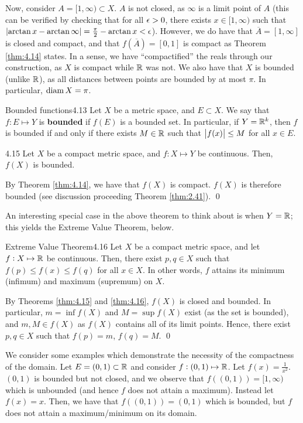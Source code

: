 Now, consider $A = [1, \infty) \subset X$. $A$ is not closed, as $\infty$ is a limit point of $A$ (this can be verified by checking that for all $\epsilon > 0$, there exists $x \in [1, \infty)$ such that $\abs{\arctan x - \arctan \infty} = \frac{\pi}{2} - \arctan x < \epsilon$). However, we do have that $\overline{A} = [1, \infty]$ is closed and compact, and that $f(\overline{A}) = [0, 1]$ is compact as Theorem \ref{thm:4.14} states. In a sense, we have ``compactified'' the reals through our construction, as $X$ is compact while $\mathbb{R}$ was not. We also have that $X$ is bounded (unlike $\mathbb{R}$), as all distances between points are bounded by at most $\pi$. In particular, $\operatorname{diam} X = \pi$. 


\setcounter{rudin}{12}
\begin{definition}{Bounded functions}{4.13}
    Let $X$ be a metric space, and $E \subset X$. We say that $f: E \mapsto Y$ is \textbf{bounded} if $f(E)$ is a bounded set. In particular, if $Y = \mathbb{R}^k$, then $f$ is bounded if and only if there exists $M \in \mathbb{R}$ such that $\abs{f(x)} \leq M$ for all $x \in E$.
\end{definition}

\setcounter{rudin}{14}
\begin{theorem}{}{4.15}
    Let $X$ be a compact metric space, and $f: X \mapsto Y$ be continuous. Then, $f(X)$ is bounded.
\end{theorem}
\begin{nproof}
    By Theorem \ref{thm:4.14}, we have that $f(X)$ is compact. $f(X)$ is therefore bounded (see discussion proceeding Theorem \ref{thm:2.41}). \qed
\end{nproof}
\noindent An interesting special case in the above theorem to think about is when $Y = \mathbb{R}$; this yields the Extreme Value Theorem, below.

\begin{theorem}{Extreme Value Theorem}{4.16}
    Let $X$ be a compact metric space, and let $f: X \mapsto \mathbb{R}$ be continuous. Then, there exist $p, q \in X$ such that $f(p) \leq f(x) \leq f(q)$ for all $x \in X$. In other words, $f$ attains its minimum (infimum) and maximum (supremum) on $X$.
\end{theorem}
\begin{nproof}
    By Theorems \ref{thm:4.15} and \ref{thm:4.16}, $f(X)$ is closed and bounded. In particular, $m = \inf f(X)$ and $M = \sup f(X)$ exist (as the set is bounded), and $m, M \in f(X)$ as $f(X)$ contains all of its limit points. Hence, there exist $p, q \in X$ such that $f(p) = m$, $f(q) = M$. \qed
\end{nproof}
\noindent We consider some examples which demonstrate the necessity of the compactness of the domain. Let $E = (0, 1) \subset \mathbb{R}$ and consider $f: (0, 1) \mapsto \mathbb{R}$. Let $f(x) = \frac{1}{x^2}$. $(0, 1)$ is bounded but not closed, and we observe that $f((0, 1)) = [1, \infty)$ which is unbounded (and hence $f$ does not attain a maximum). Instead let $f(x) = x$. Then, we have that $f((0, 1)) = (0, 1)$ which is bounded, but $f$ does not attain a maximum/minimum on its domain. 


